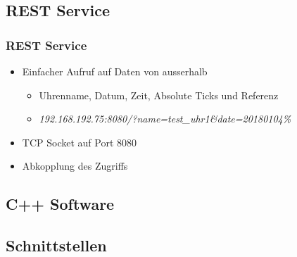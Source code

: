 \subsection{REST Service}
\begin{frame}
    \frametitle{REST Service}
    \begin{itemize}
        \item Einfacher Aufruf auf Daten von ausserhalb
        \begin{itemize}
            \item Uhrenname, Datum, Zeit, Absolute Ticks und Referenz
            \item \textit{192.168.192.75:8080/?name=test\_uhr1\&date=20180104\%}
        \end{itemize}
        \item TCP Socket auf Port 8080
        \item Abkopplung des Zugriffs
    \end{itemize}
\end{frame}

\subsection{C++ Software}
\begin{frame}

\end{frame}

\subsection{Schnittstellen}
\begin{frame}

\end{frame}